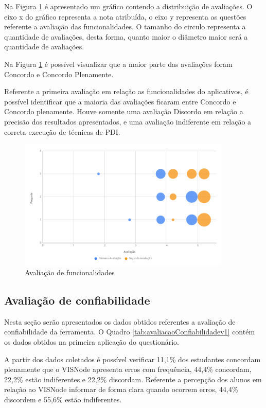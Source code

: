\documentclass[
	12pt,				%
	oneside,			%
	a4paper,			%
	english,			%
	french,				%
	spanish,			%
	brazil,				%
	]{abntex2}
\begin{document}
Na Figura \ref{fig:avaliacaoFuncionalidades} é apresentado um gráfico contendo a distribuição de avaliações. O eixo x do gráfico representa a nota atribuída, o eixo y representa as questões referente a avaliação das funcionalidades. O tamanho do circulo representa a quantidade de avaliações, desta forma, quanto maior o diâmetro maior será a quantidade de avaliações.

Na Figura \ref{fig:avaliacaoFuncionalidades} é possível visualizar que a maior parte das avaliações foram Concordo e Concordo Plenamente.

Referente a primeira avaliação em relação as funcionalidades do aplicativos, é possível identificar que a maioria das avaliações ficaram entre Concordo e Concordo plenamente. Houve somente uma avaliação Discordo em relação a precisão dos resultados apresentados, e uma avaliação indiferente em relação a correta execução de técnicas de PDI.

\begin{figure}[H]
\centering
\caption{Avaliação de funcionalidades}\label{fig:avaliacaoFuncionalidades}
\includegraphics[width=0.9\textwidth]{imagens/avaliacao_funcionalidades.png}
\sourceAuthor
\end{figure}

\subsection{Avaliação de confiabilidade}

Nesta seção serão apresentados os dados obtidos referentes a avaliação de confiabilidade da ferramenta. O Quadro \ref{tab:avaliacaoConfiabilidadev1} contém os dados obtidos na primeira aplicação do questionário. 

A partir dos dados coletados é possível verificar 11,1\% dos estudantes concordam plenamente que o VISNode apresenta erros com frequência, 44,4\% concordam, 22,2\% estão indiferentes e 22,2\% discordam. Referente a percepção dos alunos em relação ao VISNode informar de forma clara quando ocorrem erros, 44,4\% discordem e 55,6\% estão indiferentes. 
\end{document}
